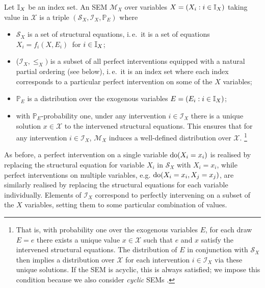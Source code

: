 \begin{definition}
	Let $\mathbb{I}_X$ be an index set.
	An SEM $\mathcal{M}_X$ over  variables ${X = (X_i : i\in\mathbb{I}_X )}$ taking value in $\mathcal{X}$ is a triple $\left(\mathcal{S}_X, \mathcal{I}_X, \mathbb{P}_{E} \right)$ where
	\begin{itemize}[noitemsep]
		\item $\mathcal{S}_X$ is a set of structural equations, i.\,e.\ it is a set of equations $X_i = f_i\left( X , E_i \right)\ $ for $i \in \mathbb{I}_X$;
		\item ($\mathcal{I}_X, \leq_X)$ is a subset of all perfect interventions equipped with a natural partial ordering (see below), i.\,e.\ it is an index set where each index corresponds to a particular perfect intervention on some of the $X$ variables;
		\item $\mathbb{P}_{E}$ is a distribution over the exogenous variables $E = ( E_i : i\in\mathbb{I}_X)$;
		\item with $\mathbb{P}_E$-probability one, under any intervention ${i \in \mathcal{I}_X}$ there is a unique solution $x\in\mathcal{X}$ to the intervened structural equations. This ensures that for any intervention ${i \in \mathcal{I}_X}$, $\mathcal{M}_X$ induces a well-defined distribution over $\mathcal{X}$.%
		\footnote{That is, with probability one over the exogenous variables $E$, for each draw $E=e$ there exists a unique value $x\in \mathcal{X}$ such that $e$ and $x$ satisfy the intervened structural equations. The distribution of $E$ in conjunction with $\mathcal{S}_X$ then implies a distribution over $\mathcal{X}$ for each intervention $i \in \mathcal{I}_X$ via these unique solutions.
			If the SEM is acyclic, this is always satisfied; we impose this condition because we also consider \emph{cyclic} SEMs \cite{bongers2016structural}.}
	\end{itemize}
\end{definition}
\medskip


As before, a perfect intervention on a single variable $\operatorname{do}(X_i=x_i)$ is realised by replacing the structural equation for variable $X_i$ in $\mathcal{S}_X$ with $X_i = x_i$,
while perfect interventions on multiple variables, e.g. $\operatorname{do}(X_i=x_i, X_j=x_j)$, are similarly realised by replacing the structural equations for each variable individually.
Elements of $\mathcal{I}_X$ correspond to perfectly intervening on a subset of the $X$ variables, setting them to some particular combination of values.

